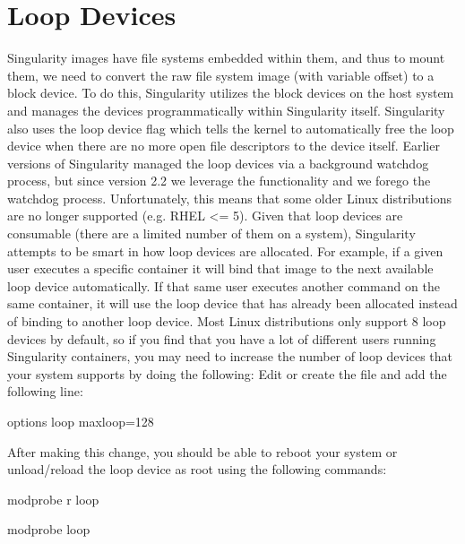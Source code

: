 \documentclass[letterpaper,10pt,english]{sphinxmanual}
\begin{document}
\section{Loop Devices}
\label{\detokenize{the_singularity_config_file:loop-devices}}
Singularity images have  file systems embedded within them, and thus to
mount them, we need to convert the raw file system image (with
variable offset) to a block device. To do this, Singularity utilizes
the  block devices on the host system and manages the devices
programmatically within Singularity itself. Singularity also uses the 
loop device  flag which tells the kernel to automatically free the loop
device when there are no more open file descriptors to the device
itself.
Earlier versions of Singularity managed the loop devices via a
background watchdog process, but since version 2.2 we leverage the 
functionality and we forego the watchdog process. Unfortunately, this
means that some older Linux distributions are no longer supported
(e.g. RHEL \textless{}= 5).
Given that loop devices are consumable (there are a limited number of
them on a system), Singularity attempts to be smart in how loop
devices are allocated. For example, if a given user executes a
specific container it will bind that image to the next available loop
device automatically. If that same user executes another command on
the same container, it will use the loop device that has already been
allocated instead of binding to another loop device. Most Linux
distributions only support 8 loop devices by default, so if you find
that you have a lot of different users running Singularity containers,
you may need to increase the number of loop devices that your system
supports by doing the following:
Edit or create the file  and add the following line:

%
\begin{sphinxVerbatim}[commandchars=\\\{\}]
options loop max\PYGZus{}loop=128
\end{sphinxVerbatim}

After making this change, you should be able to reboot your system or
unload/reload the loop device as root using the following commands:

%
\begin{sphinxVerbatim}[commandchars=\\\{\}]
\PYGZsh{} modprobe \PYGZhy{}r loop

\PYGZsh{} modprobe loop
\end{sphinxVerbatim}
\end{document}
